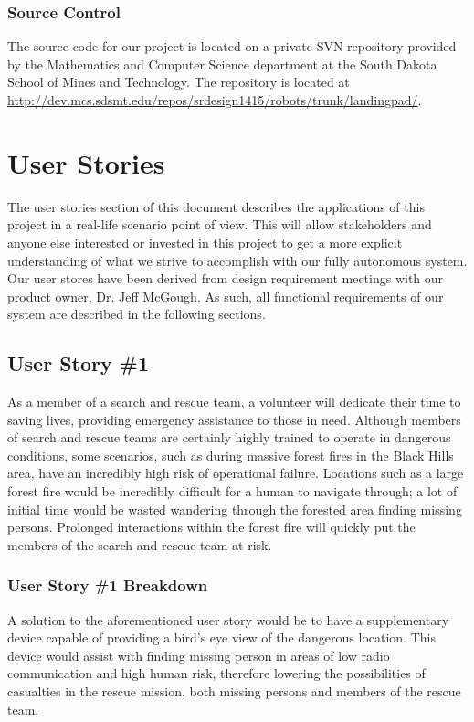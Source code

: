 \subsubsection{Source Control}
The source code for our project is located on a private SVN repository provided by the Mathematics and Computer Science department at the South Dakota School of Mines and Technology. The repository is located at \url{http://dev.mcs.sdsmt.edu/repos/srdesign1415/robots/trunk/landingpad/}.


\section{User Stories}

The user stories section of this document describes the applications of this project in a real-life scenario point of view. This will allow stakeholders and anyone else interested or invested in this project to get a more explicit understanding of what we strive to accomplish with our fully autonomous system. Our user stores have been derived from design requirement meetings with our product owner, Dr. Jeff McGough. As such, all functional requirements of our system are described in the following sections.

\subsection{User Story \#1}
As a member of a search and rescue team, a volunteer will dedicate their time to saving lives, providing emergency assistance to those in need. Although members of search and rescue teams are certainly highly trained to operate in dangerous conditions, some scenarios, such as during massive forest fires in the Black Hills area, have an incredibly high risk of operational failure. Locations such as a large forest fire would be incredibly difficult for a human to navigate through; a lot of initial time would be wasted wandering through the forested area finding missing persons. Prolonged interactions within the forest fire will quickly put the members of the search and rescue team at risk.

\subsubsection{User Story \#1 Breakdown}
 A solution to the aforementioned user story would be to have a supplementary device capable of providing a bird's eye view of the dangerous location. This device would assist with finding missing person in areas of low radio communication and high human risk, therefore lowering the possibilities of casualties in the rescue mission, both missing persons and members of the rescue team.

